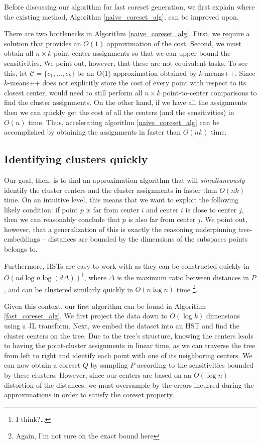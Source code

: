 \documentclass{article}
\theoremstyle{definition}
\begin{document}
Before discussing our algorithm for fast coreset generation, we first explain where the existing method, Algorithm \ref{naive_coreset_alg}, can be improved
upon. 

There are two bottlenecks in Algorithm \ref{naive_coreset_alg}. First, we require a solution that provides an $O(1)$ approximation of the cost. Second, we must
obtain all $n \times k$ point-center assignments so that we can upper-bound the sensitivities. We point out, however, that these are not equivalent tasks.  To
see this, let $\mathcal{C} = \{ c_1, \dots, c_k \} $ be an O(1) approximation obtained by $k$-means++. Since $k$-means++ does not explicitly
store the cost of every point with respect to its closest center, would need to still perform all $n \times k$ point-to-center comparisons to find the
cluster assignments. On the other hand, if we have all the assignments then we can quickly get the cost of all the centers (and the sensitivities) in $O(n)$
time. Thus, accelerating algorithm \ref{naive_coreset_alg} can be accomplished by obtaining the assignments in faster than $O(nk)$ time.

\subsection{Identifying clusters quickly}

Our goal, then, is to find an approximation algorithm that will \emph{simultaneously} identify the cluster centers and the cluster assignments in faster than
$O(nk)$ time. On an intuitive level, this means that we want to exploit the following likely condition: if point $p$ is far from center $i$ and center $i$ is
close to center $j$, then we can reasonably conclude that $p$ is also far from center $j$.  We point out, however, that a generalization of this is exactly the
reasoning underpinning tree-embeddings -- distances are bounded by the dimensions of the subspaces points belongs to.

Furthermore, HSTs are easy to work with as they can be constructed quickly in $O(nd \log n \log(d \Delta))$\footnote{I think?\dots}, where $\Delta$ is the
maximum ratio between distances in $P$, and can be clustered similarly quickly in $O(n \log n)$ time \footnote{Again, I'm not sure on the exact bound here}.

Given this context, our first algorithm can be found in Algorithm \ref{fast_coreset_alg}. We first project the data down to $O(\log k)$ dimensions using a JL
transform. Next, we embed the dataset into an HST and find the cluster centers on the tree. Due to the tree's structure, knowing the centers leads to having the
point-cluster assignments in linear time, as we can traverse the tree from left to right and identify each point with one of its neighboring centers. We can now
obtain a coreset $Q$ by sampling $P$ according to the sensitivities bounded by these clusters. However, since our centers are based on an $O( \log n)$
distortion of the distances, we must oversample by the errors incurred during the approximations in order to satisfy the coreset property.
\end{document}
